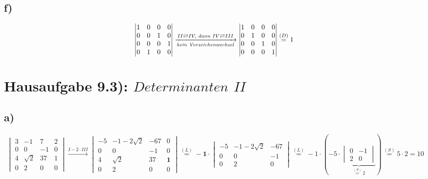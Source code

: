\documentclass[titlepage]{article}
\newcommand{\1}{\mathbb{1}}
\newcommand{\0}{\mathbb{0}}
\newcommand{\detZ}[4]{\begin{vmatrix}#1&#2\\#3&#4\end{vmatrix}}
\newcommand{\detD}[9]{\begin{vmatrix}#1&#2&#3\\#4&#5&#6\\#7&#8&#9\end{vmatrix}}
\begin{document}
		\subsection*{f)}
			\begin{align*}
				\begin{vmatrix}
					1&0&0&0\\
					0&0&1&0\\
					0&0&0&1\\
					0&1&0&0\\
				\end{vmatrix}
				\xrightarrow[\text{\textit{kein Vorzeichenwechsel}}]{II\rightleftarrows IV,\text{ \textit{dann} }IV\rightleftarrows III}
				\begin{vmatrix}
					1&0&0&0\\
					0&1&0&0\\
					0&0&1&0\\
					0&0&0&1\\
				\end{vmatrix}
				\overset{(D)}{=}1
			\end{align*}
	\section*{Hausaufgabe 9.3): $Determinanten$ $II$}
		\subsection*{a)}
		\begin{align*}
			\begin{vmatrix}
				3&-1&7&2\\
				0&0&-1&0\\
				4&\sqrt{2}&37&1\\
				0&2&0&0
			\end{vmatrix}
			\xrightarrow{I-2\cdot III}
			\begin{vmatrix}
				-5&-1-2\sqrt{2}&-67&0\\
				0&0&-1&0\\
				4&\sqrt{2}&37&\textbf{1}\\
				0&2&0&0
			\end{vmatrix}
			\overset{(L)}{=}
			-\textbf{1}\cdot\detD{-5}{-1-2\sqrt{2}}{-67}{0}{0}{-1}{0}{2}{0}\overset{(L)}{=}-1\cdot\left(-5\cdot\underbrace{\detZ{0}{-1}{2}{0}}_{\overset{(S)}{=}2}\right)\overset{(S)}{=}5\cdot2=10
		\end{align*}
\end{document}
